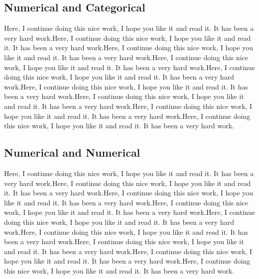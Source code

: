 \documentclass[11pt]{article}
\begin{document}
\subsection{Numerical and  Categorical}\label{binumcat}


Here, I continue doing this nice work, I hope you like it and read it. It has been a very hard work.Here, I continue doing this nice work, I hope you like it and read it. It has been a very hard work.Here, I continue doing this nice work, I hope you like it and read it. It has been a very hard work.Here, I continue doing this nice work, I hope you like it and read it. It has been a very hard work.Here, I continue doing this nice work, I hope you like it and read it. It has been a very hard work.Here, I continue doing this nice work, I hope you like it and read it. It has been a very hard work.Here, I continue doing this nice work, I hope you like it and read it. It has been a very hard work.Here, I continue doing this nice work, I hope you like it and read it. It has been a very hard work.Here, I continue doing this nice work, I hope you like it and read it. It has been a very hard work.

\subsection{Numerical and Numerical}\label{binumnum}

Here, I continue doing this nice work, I hope you like it and read it. It has been a very hard work.Here, I continue doing this nice work, I hope you like it and read it. It has been a very hard work.Here, I continue doing this nice work, I hope you like it and read it. It has been a very hard work.Here, I continue doing this nice work, I hope you like it and read it. It has been a very hard work.Here, I continue doing this nice work, I hope you like it and read it. It has been a very hard work.Here, I continue doing this nice work, I hope you like it and read it. It has been a very hard work.Here, I continue doing this nice work, I hope you like it and read it. It has been a very hard work.Here, I continue doing this nice work, I hope you like it and read it. It has been a very hard work.Here, I continue doing this nice work, I hope you like it and read it. It has been a very hard work.
\end{document}
